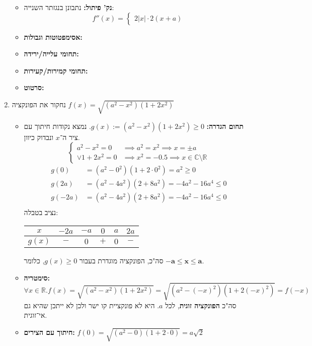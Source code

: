 \documentclass[]{article}
\newcommand\R     {\mathbb{R}}
\newcommand\C     {\mathbb{C}}
\begin{document}
\begin{enumerate}
\begin{itemize}
			\item \textbf{נק' פיתול: }נתבונן בנגזתר השנייה: 
			\[ f''(x) = \begin{cases}
				2|x| \cdot 2(x + a)
			\end{cases} \]
			\item \textbf{אסימפטוטות וגבולות: }
			\item \textbf{תחומי עלייה/ירידה: }
			\item \textbf{תחומי קמירות/קעירות: }
			\item \textbf{סרטוט: }
		\end{itemize}
		
		\item נחקור את הפונקציה $f(x) = \sqrt{(a^2 - x^2)(1 + 2x^2)}$
		\begin{itemize}
			\item \textbf{תחום הגדרה: }$g(x) := (a^{2} - x^2)(1 + 2x^2) \ge 0 $. נמצא נקודות חיתוך עם ציר ה־$x$ ונבדוק כיוון. 
			\[ \begin{cases}
				a^2 - x^2 = 0  & \implies a^2 = x^2 \implies x = \pm a\\
				\lor 1 + 2x^2 = 0 &\implies x^2 = -0.5 \implies x \in \C \setminus \R
			\end{cases} \]
			\begin{align*}
				g(0) &= (a^2 - 0^2)(1 + 2\cdot 0^2) = a^2 \ge 0\\
				g(2a) &= (a^2 - 4a^2)(2 + 8a^2) = -4a^2 - 16a^4 \le 0 \\
				g(-2a) &= (a^2 - 4a^2)(2 + 8a^2) = -4a^2 - 16a^4 \le 0 \\
			\end{align*}
			נציב בטבלה: 
			\begin{center}
				\begin{tabular}{|c|c|c|c|c|c|}
					\hline $x$ & $-2a$ & $-a$ & $0$ & $a$ & $2a$ \\
					\hline $g(x)$ & $-$ & $0$ & $+$ & $0$ & $-$ \\
					\hline
				\end{tabular}
			\end{center}
			סה"כ, הפונקציה מוגדרת בעבור $g(x) \ge 0$, כלומר $\bm{-a \le x \le a}$. 
			\item \textbf{סימטריה: }
			\[ \forall x \in \R. f(x) = \sqrt{(a^2 - x^2)(1 + 2x^2)} = \sqrt{(a^2 - (-x)^2)(1 + 2(-x)^2)} = f(-x) \]
			סה"כ \textbf{הפונקציה זוגית}, לכל $a$. היא לא פונקציית קו ישר ולכן לא ייתכן שהיא גם אי־זוגית. 
			\item \textbf{חיתוך עם הצירים: }$f(0) = \sqrt{(a^2 - 0)(1 + 2 \cdot 0)} = a\sqrt{2}$

\end{itemize}
\end{enumerate}
\end{document}
